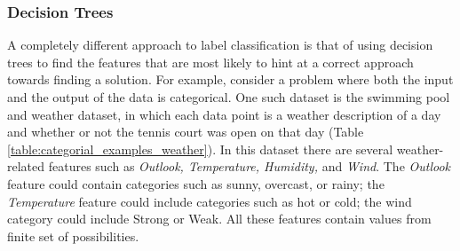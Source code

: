 \subsubsection{Decision Trees}
\label{sec:decision_trees}
A completely different approach to label classification is that of using decision trees to find the features that are most likely to hint at a correct approach towards finding a solution. For example, consider a problem where both the input and the output of the data is categorical. One such dataset is the swimming pool and weather dataset, in which each data point is a weather description of a day and whether or not the tennis court was open on that day (Table \ref{table:categorial_examples_weather}). In this dataset there are several weather-related features such as \textit{Outlook, Temperature, Humidity,} and \textit{Wind}. The \textit{Outlook} feature could contain categories such as sunny, overcast, or rainy; the \textit{Temperature} feature could include categories such as hot or cold; the wind category could include Strong or Weak. All these features contain values from finite set of possibilities. 

